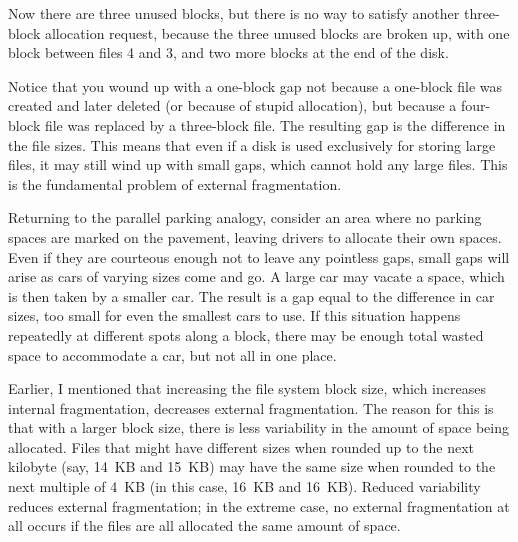 Now there are three unused blocks, but there is no way to
satisfy another three-block allocation request, because the three
unused blocks are broken up, with one block between files 4 and 3, and
two more blocks at the end of the disk.

Notice that you wound up with a one-block gap not because a one-block
file was created and later deleted (or because of stupid allocation),
but because a four-block file was replaced by a three-block file.  The
resulting gap is the difference in the file sizes.  This means that
even if a disk is used exclusively for storing large files, it may
still wind up with small gaps, which cannot hold any large files.
This is the fundamental problem of external fragmentation.

Returning to the parallel parking analogy, consider an area where no
parking spaces are marked on the pavement, leaving drivers to allocate
their own spaces.  Even if they are courteous enough not to leave any
pointless gaps, small gaps will arise as cars of varying sizes come
and go.  A large car may vacate a space, which is then taken by a
smaller car.  The result is a gap equal to the difference in car
sizes, too small for even the smallest cars to use.  If this situation
happens repeatedly at different spots along a block, there may be enough
total wasted space to accommodate a car, but not all in one place.

Earlier, I mentioned that increasing the file system block size,
which increases internal fragmentation, decreases external
fragmentation.  The reason for this is that with a larger block size,
there is less variability in the amount of space being allocated.
Files that might have different sizes when rounded up to the next
kilobyte (say, 14~KB and 15~KB) may have the same size when rounded to
the next multiple of 4~KB (in this case, 16~KB and 16~KB).  Reduced
variability reduces external fragmentation; in the extreme case, no
external fragmentation at all occurs if the files are all allocated
the same amount of space.

